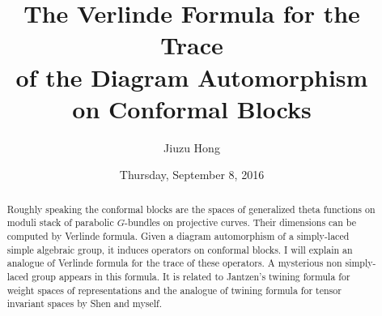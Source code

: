\documentclass{UAmathtalk}
\author{Jiuzu Hong}
\title{The Verlinde Formula for the Trace\\ of the Diagram Automorphism\\[\smallskipamount] on Conformal Blocks}
\date{Thursday, September 8, 2016}
\begin{document}
\maketitle

\begin{abstract}
Roughly speaking the conformal blocks are the spaces of generalized theta functions on moduli stack of parabolic $G$-bundles on projective curves.
Their dimensions can be computed by Verlinde formula.
Given a diagram automorphism of a simply-laced simple algebraic group, it induces operators on conformal blocks.
I will explain an analogue of Verlinde formula for the trace of these operators.
A mysterious non simply-laced group appears in this formula.
It is related to Jantzen's twining formula for weight spaces of representations and the analogue of twining formula for tensor invariant spaces by Shen and myself.
\end{abstract}
\end{document}
